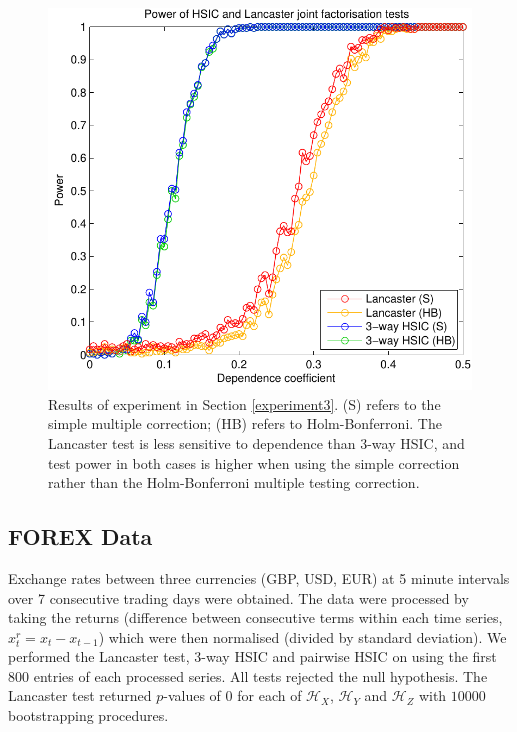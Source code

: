 \documentclass[]{article}
\begin{document}
\begin{figure}[ht]
\vskip 0.2in
\begin{center}
\centerline{\includegraphics[scale=0.6]{UAI_Figure3.pdf}}
\caption{Results of experiment in Section \ref{experiment3}. (S) refers to the simple multiple correction; (HB) refers to Holm-Bonferroni. The Lancaster test is less sensitive to dependence than 3-way HSIC, and test power in both cases is higher when using the simple correction rather than the Holm-Bonferroni multiple testing correction.}
\label{strong-pairwise}
\end{center}
\vskip -0.2in
\end{figure} 

\subsection{FOREX Data}

Exchange rates between three currencies (GBP, USD, EUR) at 5 minute intervals over 7 consecutive trading days were obtained. The data were processed by taking the returns (difference between consecutive terms within each time series, $x_t^r = x_t-x_{t-1}$) which were then normalised (divided by standard deviation). We performed the Lancaster test, 3-way HSIC and pairwise HSIC on using the first $800$ entries of each processed series. All tests rejected the null hypothesis. The Lancaster test returned $p$-values of 0 for each of $\mathcal{H}_X$, $\mathcal{H}_Y$ and $\mathcal{H}_Z$ with $10000$ bootstrapping procedures.
\end{document}
